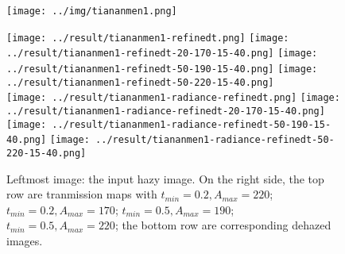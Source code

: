 \documentclass{article}
\begin{document}
\begin{figure}[H]
    \centering
    \begin{minipage}[b]{0.319\linewidth}
        \centering
        \texttt{[image: ../img/tiananmen1.png]}
    \end{minipage}
    \begin{minipage}[b]{0.66\linewidth}
       \centering
        \texttt{[image: ../result/tiananmen1-refinedt.png]}
        \texttt{[image: ../result/tiananmen1-refinedt-20-170-15-40.png]}
        \texttt{[image: ../result/tiananmen1-refinedt-50-190-15-40.png]}
        \texttt{[image: ../result/tiananmen1-refinedt-50-220-15-40.png]}
        \\
        \texttt{[image: ../result/tiananmen1-radiance-refinedt.png]}
        \texttt{[image: ../result/tiananmen1-radiance-refinedt-20-170-15-40.png]}
        \texttt{[image: ../result/tiananmen1-radiance-refinedt-50-190-15-40.png]}
        \texttt{[image: ../result/tiananmen1-radiance-refinedt-50-220-15-40.png]}
    \end{minipage}
   
    \captionsetup{singlelinecheck=off}
    \caption{Leftmost image: the input hazy image. On the right side, the top row are tranmission maps with
        $t_{min} = 0.2, A_{max} = 220$;
        $t_{min} = 0.2, A_{max} = 170$;
        $t_{min} = 0.5, A_{max} = 190$;
        $t_{min} = 0.5, A_{max} = 220$;
        the bottom row are corresponding dehazed images.
    }
     \label{fig:sp4}
\end{figure}



\end{document}
